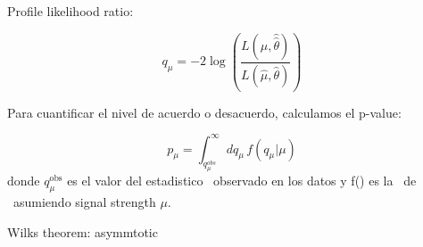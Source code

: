 Profile likelihood ratio:

\begin{equation}
  q_\mu = -2 \log \left( \frac{L(\mu, \hat{\hat{\theta}})}{L(\widehat{\mu}, \hat{\theta})} \right)
\end{equation}

Para cuantificar el nivel de acuerdo o desacuerdo, calculamos el p-value:

\begin{equation}
   p_\mu = \int_{q^{obs}_\mu}^{\infty} dq_\mu \, f(q_\mu | \mu)
\end{equation}
%
donde $q^\text{obs}_\mu$ es el valor del estadistico \qmu\ observado en los datos y f() es la \pdf\ de \qmu\ asumiendo
signal strength  $\mu$.

Wilks theorem: asymmtotic



